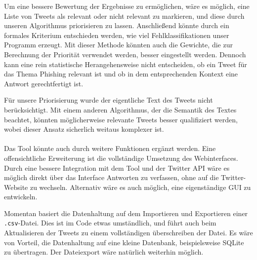 \documentclass[runningheads]{llncs}
\begin{document}
Um eine bessere Bewertung der Ergebnisse zu ermöglichen, wäre es möglich, eine Liste von Tweets als relevant oder nicht relevant zu markieren, und diese durch unseren Algorithmus priorisieren zu lassen.
Anschließend könnte durch ein formales Kriterium entschieden werden, wie viel Fehlklassifikationen unser Programm erzeugt.
Mit dieser Methode könnten auch die Gewichte, die zur Berechnung der Priorität verwendet werden, besser eingestellt werden.
Dennoch kann eine rein statistische Herangehensweise nicht entscheiden, ob ein Tweet für das Thema Phishing relevant ist und ob in dem entsprechenden Kontext eine Antwort gerechtfertigt ist.

Für unsere Priorisierung wurde der eigentliche Text des Tweets nicht berücksichtigt.
Mit einem anderen Algorithmus, der die Semantik des Textes beachtet, könnten möglicherweise relevante Tweets besser qualifiziert werden, wobei dieser Ansatz sicherlich weitaus komplexer ist.

\paragraph{} Das Tool könnte auch durch weitere Funktionen ergänzt werden.
Eine offensichtliche Erweiterung ist die vollständige Umsetzung des Webinterfaces.
Durch eine bessere Integration mit dem Tool und der Twitter API wäre es möglich direkt über das Interface Antworten zu verfassen, ohne auf die Twitter-Website zu wechseln.
Alternativ wäre es auch möglich, eine eigenständige GUI zu entwickeln.

Momentan basiert die Datenhaltung auf dem Importieren und Exportieren einer \texttt{.csv}-Datei.
Dies ist im Code etwas umständlich, und führt auch beim Aktualisieren der Tweets zu einem vollständigen überschreiben der Datei.
Es wäre von Vorteil, die Datenhaltung auf eine kleine Datenbank, beispielsweise SQLite zu übertragen.
Der Dateiexport wäre natürlich weiterhin möglich.

%
%

%

\end{document}

